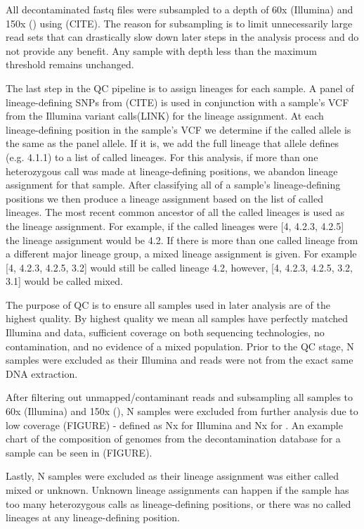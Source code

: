 All decontaminated fastq files were subsampled to a depth of 60x (Illumina) and 150x (\ont{}) using (CITE). The reason for subsampling is to limit unnecessarily large read sets that can drastically slow down later steps in the analysis process and do not provide any benefit. Any sample with depth less than the maximum threshold remains unchanged.  

The last step in the QC pipeline is to assign lineages for each sample. A panel of lineage-defining SNPs from (CITE) is used in conjunction with a sample's VCF from the Illumina variant calls(LINK) for the lineage assignment. At each lineage-defining position in the sample's VCF we determine if the called allele is the same as the panel allele. If it is, we add the full lineage that allele defines (e.g. 4.1.1) to a list of called lineages. For this analysis, if more than one heterozygous call was made at lineage-defining positions, we abandon lineage assignment for that sample. After classifying all of a sample's lineage-defining positions we then produce a lineage assignment based on the list of called lineages. The most recent common ancestor of all the called lineages is used as the lineage assignment. For example, if the called lineages were [4, 4.2.3, 4.2.5] the lineage assignment would be 4.2. If there is more than one called lineage from a different major lineage group, a mixed lineage assignment is given. For example [4, 4.2.3, 4.2.5, 3.2] would still be called lineage 4.2, however, [4, 4.2.3, 4.2.5, 3.2, 3.1] would be called mixed.

The purpose of QC is to ensure all samples used in later analysis are of the highest quality. By highest quality we mean all samples have perfectly matched Illumina and \ont{} data, sufficient coverage on both sequencing technologies, no contamination, and no evidence of a mixed \mtb{} population. Prior to the QC stage, N samples were excluded as their Illumina and \ont{} reads were not from the exact same DNA extraction.  

After filtering out unmapped/contaminant reads and subsampling all samples to 60x (Illumina) and 150x (\ont{}), N samples were excluded from further analysis due to low coverage (FIGURE) - defined as Nx for Illumina and Nx for \ont{}. An example chart of the composition of genomes from the decontamination database for a sample can be seen in (FIGURE).  

Lastly, N samples were excluded as their lineage assignment was either called mixed or unknown. Unknown lineage assignments can happen if the sample has too many heterozygous calls as lineage-defining positions, or there was no called lineages at any lineage-defining position.  

